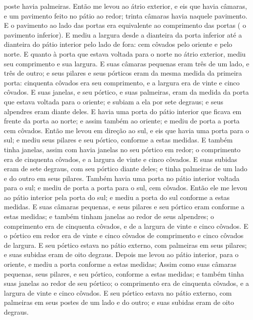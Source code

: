 {{} poste havia palmeiras.
Então me levou ao átrio exterior, e eis que havia
{} câmaras, e um pavimento feito no pátio ao redor; trinta câmaras havia naquele pavimento.
E o pavimento ao lado das portas era equivalente ao comprimento das portas (
{} o pavimento inferior).
E mediu a largura desde a dianteira da porta inferior até a dianteira do pátio interior pelo lado de fora: cem côvados pelo oriente e pelo norte.
E quanto à porta que estava voltada para o norte no átrio exterior, mediu seu comprimento e sua largura.
E suas câmaras pequenas eram três de um lado, e três de outro; e seus pilares e seus pórticos eram da mesma medida da primeira porta: cinquenta côvados era seu comprimento, e a largura era de vinte e cinco côvados.
E suas janelas, e seu pórtico, e suas palmeiras, eram da medida da porta que estava voltada para o oriente; e subiam a ela por sete degraus; e seus alpendres eram diante deles.
E havia uma porta do pátio interior que ficava em frente da porta ao norte; e assim também
{} ao oriente; e mediu de porta a porta cem côvados.
Então me levou em direção ao sul, e eis que havia uma porta para o sul; e mediu seus pilares e seu pórtico, conforme a estas medidas.
E também tinha janelas, assim com havia janelas no seu pórtico em redor; o comprimento era de cinquenta côvados, e a largura de vinte e cinco côvados.
E suas subidas eram de sete degraus, com seu pórtico diante deles; e tinha palmeiras de um lado e do outro em seus pilares.
Também havia uma porta no pátio interior voltada para o sul; e mediu de porta a porta para o sul, cem côvados.
Então ele me levou ao pátio interior pela porta do sul; e mediu a porta do sul conforme a estas medidas.
E suas câmaras pequenas, e seus pilares e seu pórtico eram conforme a estas medidas; e também tinham janelas ao redor de seus alpendres; o comprimento era de cinquenta côvados, e de a largura de vinte e cinco côvados.
E o pórtico em redor era de vinte e cinco côvados de comprimento e cinco côvados de largura.
E seu pórtico estava no pátio externo, com palmeiras em seus pilares; e suas subidas eram de oito degraus.
Depois me levou ao pátio interior, para o oriente, e mediu a porta conforme a estas medidas;
Assim como suas câmaras pequenas, seus pilares, e seu pórtico, conforme a estas medidas; e também tinha suas janelas ao redor de seu pórtico; o comprimento era de cinquenta côvados, e a largura de vinte e cinco côvados.
E seu pórtico estava no pátio externo, com palmeiras em seus postes de um lado e do outro; e suas subidas eram de oito degraus.
}
